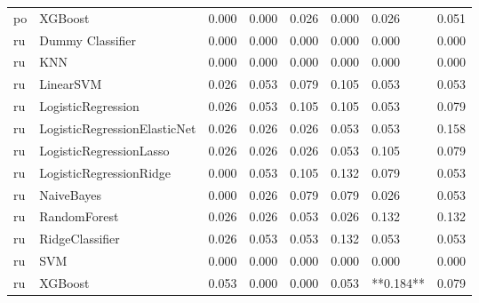 \begin{tabular}{llllllll}
      po &                      XGBoost & 0.000 &                     0.000 &                 0.026 &                  0.000 &                                   0.026 &     0.051 \\
      ru &             Dummy Classifier & 0.000 &                     0.000 &                 0.000 &                  0.000 &                                   0.000 &     0.000 \\
      ru &                          KNN & 0.000 &                     0.000 &                 0.000 &                  0.000 &                                   0.000 &     0.000 \\
      ru &                    LinearSVM & 0.026 &                     0.053 &                 0.079 &                  0.105 &                                   0.053 &     0.053 \\
      ru &           LogisticRegression & 0.026 &                     0.053 &                 0.105 &                  0.105 &                                   0.053 &     0.079 \\
      ru & LogisticRegressionElasticNet & 0.026 &                     0.026 &                 0.026 &                  0.053 &                                   0.053 &     0.158 \\
      ru &      LogisticRegressionLasso & 0.026 &                     0.026 &                 0.026 &                  0.053 &                                   0.105 &     0.079 \\
      ru &      LogisticRegressionRidge & 0.000 &                     0.053 &                 0.105 &                  0.132 &                                   0.079 &     0.053 \\
      ru &                   NaiveBayes & 0.000 &                     0.026 &                 0.079 &                  0.079 &                                   0.026 &     0.053 \\
      ru &                 RandomForest & 0.026 &                     0.026 &                 0.053 &                  0.026 &                                   0.132 &     0.132 \\
      ru &              RidgeClassifier & 0.026 &                     0.053 &                 0.053 &                  0.132 &                                   0.053 &     0.053 \\
      ru &                          SVM & 0.000 &                     0.000 &                 0.000 &                  0.000 &                                   0.000 &     0.000 \\
      ru &                      XGBoost & 0.053 &                     0.000 &                 0.000 &                  0.053 &                               **0.184** &     0.079 \\
\bottomrule
\end{tabular}
